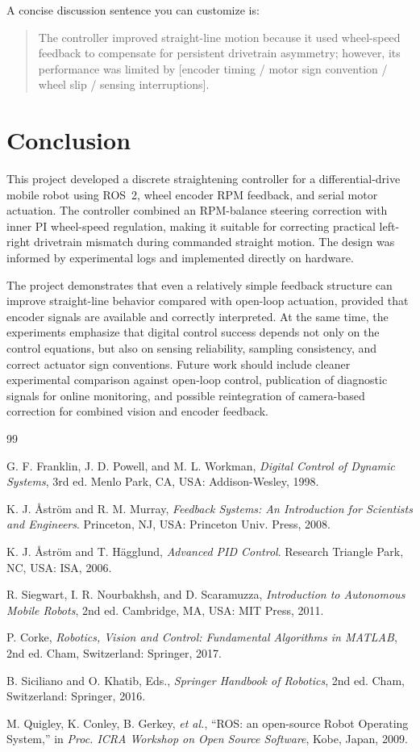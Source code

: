 \documentclass[conference]{IEEEtran}
\begin{document}
A concise discussion sentence you can customize is:
\begin{quote}
The controller improved straight-line motion because it used wheel-speed feedback to compensate for persistent drivetrain asymmetry; however, its performance was limited by [encoder timing / motor sign convention / wheel slip / sensing interruptions].
\end{quote}

\section{Conclusion}
This project developed a discrete straightening controller for a differential-drive mobile robot using ROS~2, wheel encoder RPM feedback, and serial motor actuation. The controller combined an RPM-balance steering correction with inner PI wheel-speed regulation, making it suitable for correcting practical left-right drivetrain mismatch during commanded straight motion. The design was informed by experimental logs and implemented directly on hardware.

The project demonstrates that even a relatively simple feedback structure can improve straight-line behavior compared with open-loop actuation, provided that encoder signals are available and correctly interpreted. At the same time, the experiments emphasize that digital control success depends not only on the control equations, but also on sensing reliability, sampling consistency, and correct actuator sign conventions. Future work should include cleaner experimental comparison against open-loop control, publication of diagnostic signals for online monitoring, and possible reintegration of camera-based correction for combined vision and encoder feedback.

\begin{thebibliography}{99}

G. F. Franklin, J. D. Powell, and M. L. Workman, \emph{Digital Control of Dynamic Systems}, 3rd ed. Menlo Park, CA, USA: Addison-Wesley, 1998.

K. J. {\AA}str\"om and R. M. Murray, \emph{Feedback Systems: An Introduction for Scientists and Engineers}. Princeton, NJ, USA: Princeton Univ. Press, 2008.

K. J. {\AA}str\"om and T. H\"agglund, \emph{Advanced PID Control}. Research Triangle Park, NC, USA: ISA, 2006.

R. Siegwart, I. R. Nourbakhsh, and D. Scaramuzza, \emph{Introduction to Autonomous Mobile Robots}, 2nd ed. Cambridge, MA, USA: MIT Press, 2011.

P. Corke, \emph{Robotics, Vision and Control: Fundamental Algorithms in MATLAB}, 2nd ed. Cham, Switzerland: Springer, 2017.

B. Siciliano and O. Khatib, Eds., \emph{Springer Handbook of Robotics}, 2nd ed. Cham, Switzerland: Springer, 2016.

M. Quigley, K. Conley, B. Gerkey, \emph{et al.}, ``ROS: an open-source Robot Operating System,'' in \emph{Proc. ICRA Workshop on Open Source Software}, Kobe, Japan, 2009.

\end{thebibliography}
\end{document}
